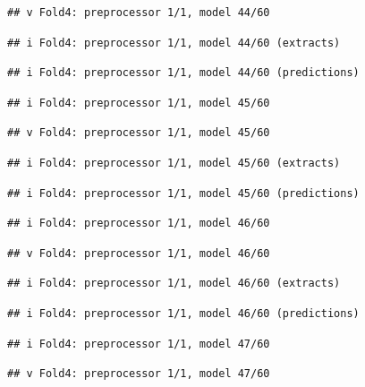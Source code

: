 \documentclass[
]{article}
\begin{document}
\begin{verbatim}
## v Fold4: preprocessor 1/1, model 44/60
\end{verbatim}

\begin{verbatim}
## i Fold4: preprocessor 1/1, model 44/60 (extracts)
\end{verbatim}

\begin{verbatim}
## i Fold4: preprocessor 1/1, model 44/60 (predictions)
\end{verbatim}

\begin{verbatim}
## i Fold4: preprocessor 1/1, model 45/60
\end{verbatim}

\begin{verbatim}
## v Fold4: preprocessor 1/1, model 45/60
\end{verbatim}

\begin{verbatim}
## i Fold4: preprocessor 1/1, model 45/60 (extracts)
\end{verbatim}

\begin{verbatim}
## i Fold4: preprocessor 1/1, model 45/60 (predictions)
\end{verbatim}

\begin{verbatim}
## i Fold4: preprocessor 1/1, model 46/60
\end{verbatim}

\begin{verbatim}
## v Fold4: preprocessor 1/1, model 46/60
\end{verbatim}

\begin{verbatim}
## i Fold4: preprocessor 1/1, model 46/60 (extracts)
\end{verbatim}

\begin{verbatim}
## i Fold4: preprocessor 1/1, model 46/60 (predictions)
\end{verbatim}

\begin{verbatim}
## i Fold4: preprocessor 1/1, model 47/60
\end{verbatim}

\begin{verbatim}
## v Fold4: preprocessor 1/1, model 47/60
\end{verbatim}
\end{document}
